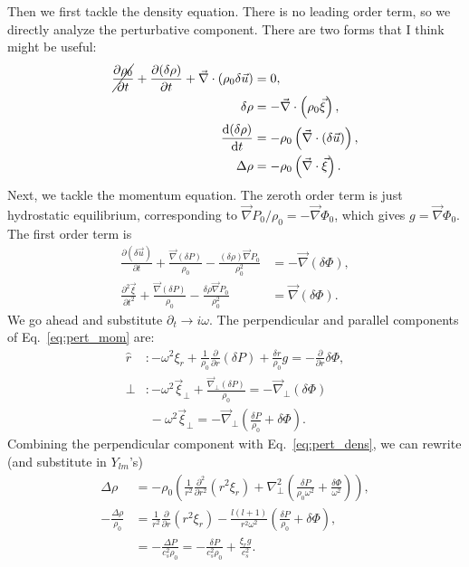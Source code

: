 \documentclass[11pt,
        usenames, %
        twocolumn,
        landscape,
        dvipsnames %
    ]{article}
\newcommand*{\rd}[2]{\frac{\mathrm{d}#1}{\mathrm{d}#2}}
\newcommand*{\pd}[2]{\frac{\partial#1}{\partial#2}}
\newcommand*{\ptd}[2]{\frac{\partial^2 #1}{\partial#2^2}}
\newcommand*{\p}[1]{\left(#1\right)}
\begin{document}
Then we first tackle the density equation. There is no leading order term, so we
directly analyze the perturbative component. There are two forms that I think
might be useful:
\begin{align}
    \cancel{\pd{\rho_0}{t}} +
    \pd{(\delta \rho)}{t} + \vec{\nabla} \cdot \p{\rho_0 \delta \vec{u}}
        &= 0,\nonumber\\
    \delta \rho &= -\vec{\nabla} \cdot \p{\rho_0 \vec{\xi}},\\
    \rd{(\delta \rho)}{t} &= -\rho_0\p{\vec{\nabla} \cdot \p{\delta \vec{u}}}
        ,\nonumber\\
    \Delta \rho &= -\rho_0\p{\vec{\nabla} \cdot \vec{\xi}}.\label{eq:pert_dens}
\end{align}
Next, we tackle the momentum equation. The zeroth order term is just hydrostatic
equilibrium, corresponding to $\vec{\nabla}P_0 / \rho_0 = -\vec{\nabla} \Phi_0$,
which gives $g = \vec{\nabla} \Phi_0$. The first order term is
\begin{align}
    \pd{(\delta \vec{u})}{t} + \frac{\vec{\nabla} (\delta P)}{\rho_0}
        - \frac{(\delta \rho) \vec{\nabla}P_0}{\rho_0^2} &=
        -\vec{\nabla}\p{\delta \Phi},\nonumber\\
    \ptd{\vec{\xi}}{t} + \frac{\vec{\nabla}(\delta P)}{\rho_0}
        - \frac{\delta \rho \vec{\nabla}P_0}{\rho_0^2} &= \vec{\nabla}(\delta
        \Phi).\label{eq:pert_mom}
\end{align}
We go ahead and substitute $\partial_t \to i\omega$. The perpendicular and
parallel components of Eq.~\eqref{eq:pert_mom} are:
\begin{align}
    \hat{r} &: -\omega^2 \xi_r + \frac{1}{\rho_0}\pd{}{r}(\delta P)
         + \frac{\delta r}{\rho_0}g = -\pd{}{r}\delta \Phi,\\
    \perp &: -\omega^2 \vec{\xi}_\perp + \frac{\vec{\nabla}_\perp (\delta P)}{
        \rho_0} = -\vec{\nabla}_\perp\p{\delta\Phi}\nonumber\\
        &\; -\omega^2\vec{\xi}_\perp = -\vec{\nabla}_\perp
            \p{\frac{\delta P}{\rho_0} + \delta \Phi}\label{eq:momperp}.
\end{align}
Combining the perpendicular component with Eq.~\eqref{eq:pert_dens}, we can
rewrite (and substitute in $Y_{lm}$'s)
\begin{align}
    \Delta \rho &= -\rho_0\p{\frac{1}{r^2}\ptd{}{r}\p{r^2\xi_r}
            + \nabla_\perp^2 \p{\frac{\delta P}{\rho_0\omega^2} + \frac{\delta
            \Phi}{\omega^2}}},\nonumber\\
    -\frac{\Delta \rho}{\rho_0}
        &= \frac{1}{r^2}\pd{}{r}\p{r^2\xi_r}
            - \frac{l(l + 1)}{r^2\omega^2}\p{\frac{\delta P}{\rho_0}
                + \delta \Phi},\nonumber\\
    &= -\frac{\Delta P}{c_s^2\rho_0} = -\frac{\delta P}{c_s^2\rho_0}
            + \frac{\xi_r g}{c_s^2}.
\end{align}
\end{document}
